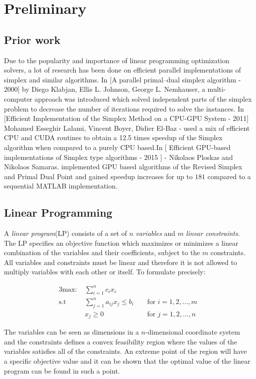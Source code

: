 \section{Preliminary}
\subsection{Prior work}
Due to the popularity and importance of linear programming optimization solvers, a lot of research has been done on efficient parallel implementations of simplex and similar algorithms. In [A parallel primal–dual simplex algorithm - 2000] by Diego Klabjan, Ellis L. Johnson, George L. Nemhauser, a multi-computer approach was introduced which solved independent parts of the simplex problem to decrease the number of iterations required to solve the instances. In [Efficient Implementation of the Simplex Method on a CPU-GPU System - 2011] Mohamed Esseghir Lalami, Vincent Boyer, Didier El-Baz - used a mix of efficient CPU and CUDA routines to obtain a 12.5 times speedup of the Simplex algorithm when compared to a purely CPU based.In [ Efficient GPU-based implementations of Simplex type algorithms - 2015 ] - Nikolaos Ploskas and Nikolaos Samaras. implemented GPU based algorithms of the Revised Simplex and Primal Dual Point and gained speedup increases for up to $181$ compared to a sequential MATLAB implementation.

\subsection{Linear Programming}
A \textit{linear program}(LP) consists of a set of $n$ \textit{variables} and $m$ \textit{linear constraints}. The LP specifies an objective function which maximizes or minimizes a linear combination of the variables and their coefficients, subject to the $m$ constraints. All variables and constraints must be linear and therefore it is not allowed to multiply variables with each other or itself. To formulate precisely:

\begin{alignat*}{3}
\text{max: } &\sum_{i=1}^{n} c_i x_i\\
\text{s.t }  & \sum_{j=1}^{n} a_{ij} x_j \leq b_i && \text{ for } i=1,2,...,m\\
& x_j \geq 0                         && \text{ for } j=1,2,...,n
\end{alignat*}

The variables can be seen as dimensions in a $n$-dimensional coordinate system and the constraints defines a convex feasibility region where the values of the variables satisfies all of the constraints. An extreme point of the region will have a specific objective value and it can be shown that the optimal value of the linear program can be found in such a point.

